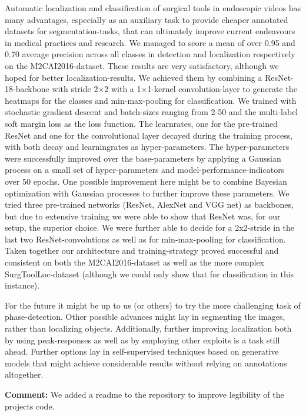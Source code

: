 Automatic localization and classification of surgical tools in endoscopic videos has many advantages, especially as an auxiliary task to provide cheaper annotated datasets for segmentation-tasks, that can ultimately improve current endeavours in medical practices and research. We managed to score a mean of over 0.95 and 0.70 average precision across all classes in detection and localization respectively on the M2CAI2016-dataset. 
These results are very satisfactory, although we hoped for better localization-results. We achieved them by combining a ResNet-18-backbone with stride 2$\times$2 with a 1$\times$1-kernel convolution-layer to generate the heatmaps for the classes and min-max-pooling for classification. 
We trained with stochastic gradient descent and batch-sizes ranging from 2-50 and the multi-label soft margin loss as the loss function. The learnrates, one for the pre-trained ResNet and one for the convolutional layer decayed during the training process, with both decay and learningrates as hyper-parameters.
The hyper-parameters were successfully improved over the base-parameters by applying a Gaussian process on a small set of hyper-parameters and model-performance-indicators over 50 epochs. One possible improvement here might be to combine Bayesian optimization with Gaussian processes to further improve these parameters.
We tried three pre-trained networks (ResNet, AlexNet and VGG net) as backbones, but due to extensive training we were able to show that ResNet was, for our setup, the superior choice. We were further able to decide for a 2x2-stride in the last two ResNet-convolutions as well as for min-max-pooling for classification. Taken together our architecture and training-strategy proved successful and consistent on both the M2CAI2016-dataset as well as the more complex SurgToolLoc-dataset (although we could only show that for classification in this instance).

For the future it might be up to us (or others) to try the more challenging task of phase-detection. Other possible advances might lay in segmenting the images, rather than localizing objects. Additionally, further improving localization both by using peak-responses as well as by employing other exploits is a task still ahead. Further options lay in self-supervised techniques based on generative models that might achieve considerable results without relying on annotations altogether.

\textbf{Comment:} We added a readme to the repository to improve legibility of the projects code.